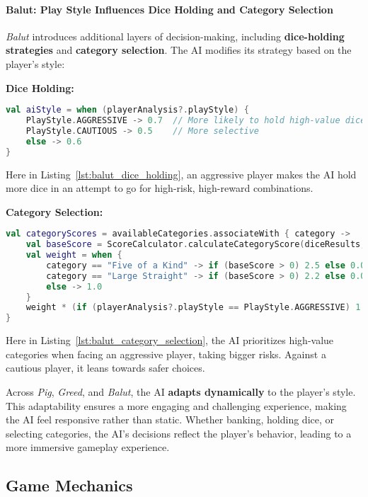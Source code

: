 \paragraph{Balut: Play Style Influences Dice Holding and Category Selection}  
\emph{Balut} introduces additional layers of decision-making, including \textbf{dice-holding strategies} and \textbf{category selection}. The AI modifies its strategy based on the player’s style:

\textbf{Dice Holding:}  
\begin{lstlisting}[language=Kotlin, caption={AI Dice Holding in Balut}, label=lst:balut_dice_holding]
val aiStyle = when (playerAnalysis?.playStyle) {
    PlayStyle.AGGRESSIVE -> 0.7  // More likely to hold high-value dice
    PlayStyle.CAUTIOUS -> 0.5    // More selective
    else -> 0.6
}
\end{lstlisting}

Here in Listing~\ref{lst:balut_dice_holding}, an aggressive player makes the AI hold more dice in an attempt to go for high-risk, high-reward combinations.

\textbf{Category Selection:}  
\begin{lstlisting}[language=Kotlin, caption={AI Category Selection in Balut}, label=lst:balut_category_selection]
val categoryScores = availableCategories.associateWith { category ->
    val baseScore = ScoreCalculator.calculateCategoryScore(diceResults, category)
    val weight = when {
        category == "Five of a Kind" -> if (baseScore > 0) 2.5 else 0.0
        category == "Large Straight" -> if (baseScore > 0) 2.2 else 0.0
        else -> 1.0
    }
    weight * (if (playerAnalysis?.playStyle == PlayStyle.AGGRESSIVE) 1.2 else 1.0)
}
\end{lstlisting}

Here in Listing~\ref{lst:balut_category_selection}, the AI prioritizes high-value categories when facing an aggressive player, taking bigger risks. Against a cautious player, it leans towards safer choices.

Across \emph{Pig}, \emph{Greed}, and \emph{Balut}, the AI \textbf{adapts dynamically} to the player's style. This adaptability ensures a more engaging and challenging experience, making the AI feel responsive rather than static. Whether banking, holding dice, or selecting categories, the AI's decisions reflect the player's behavior, leading to a more immersive gameplay experience.


\subsection{Game Mechanics}

